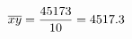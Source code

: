 \documentclass[preview]{standalone}
\begin{document}
\begin{align*}
\special{dvisvgm:raw <g id='unique000'>}\overline{xy} = \frac{45173}{10} = 4517.3\special{dvisvgm:raw </g>}
\end{align*}
\end{document}
